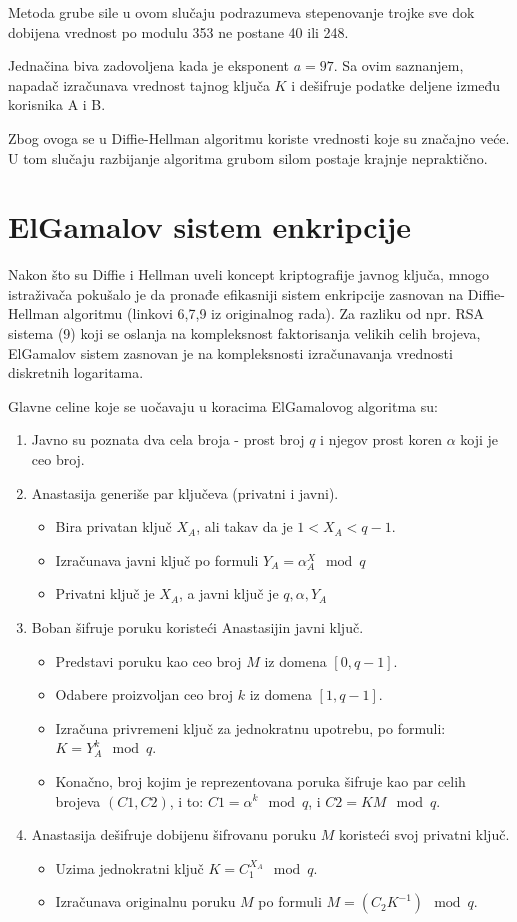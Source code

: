 \documentclass[a4paper]{article}
\begin{document}
Metoda grube sile u ovom slučaju podrazumeva stepenovanje trojke sve dok dobijena vrednost po modulu 353 ne postane 40 ili 248.

Jednačina biva zadovoljena kada je eksponent $a=97$. Sa ovim saznanjem, napadač izračunava vrednost tajnog ključa $K$ i dešifruje podatke deljene između korisnika A i B.

Zbog ovoga se u Diffie-Hellman algoritmu koriste vrednosti koje su značajno veće. U tom slučaju razbijanje algoritma grubom silom postaje krajnje nepraktično.
 

\section{ElGamalov sistem enkripcije}
\label{sec:Elgamal}
Nakon što su Diffie i Hellman uveli koncept kriptografije javnog ključa, mnogo istraživača pokušalo je da pronađe efikasniji sistem enkripcije zasnovan na Diffie-Hellman algoritmu (linkovi 6,7,9 iz originalnog rada). Za razliku od npr. RSA sistema (9) koji se oslanja na kompleksnost faktorisanja velikih celih brojeva, ElGamalov sistem zasnovan je na kompleksnosti izračunavanja vrednosti diskretnih logaritama.

Glavne celine koje se uočavaju u koracima ElGamalovog algoritma su:
\begin{enumerate}
    \item Javno su poznata dva cela broja - prost broj $q$ i njegov prost koren $\alpha$ koji je ceo broj.
    \item Anastasija generiše par ključeva (privatni i javni).\begin{itemize}
        \item Bira privatan ključ $X_A$, ali takav da je $1<X_A<q-1$.
        \item Izračunava javni ključ po formuli $Y_A=\alpha^X_A\mod q$
        \item Privatni ključ je $X_A$, a javni ključ je ${q,\alpha,Y_A}$
    \end{itemize}
    \item Boban šifruje poruku koristeći Anastasijin javni ključ.\begin{itemize}
        \item Predstavi poruku kao ceo broj $M$ iz domena $[0,q-1]$.
        \item Odabere proizvoljan ceo broj $k$ iz domena $[1,q-1]$.
        \item Izračuna privremeni ključ za jednokratnu upotrebu, po formuli: $K=Y_A^k\mod q$.
        \item Konačno, broj kojim je reprezentovana poruka šifruje kao par celih brojeva $(C1,C2)$, i to: $C1=\alpha^k \mod q$, i $C2=KM\mod q$.
    \end{itemize}
    \item Anastasija dešifruje dobijenu šifrovanu poruku $M$ koristeći svoj privatni ključ.\begin{itemize}
        \item Uzima jednokratni ključ $K=C_1^{X_A}\mod q$.
        \item Izračunava originalnu poruku $M$ po formuli $M=(C_2K^{-1})\mod q$.
    \end{itemize}
\end{enumerate}
\end{document}
